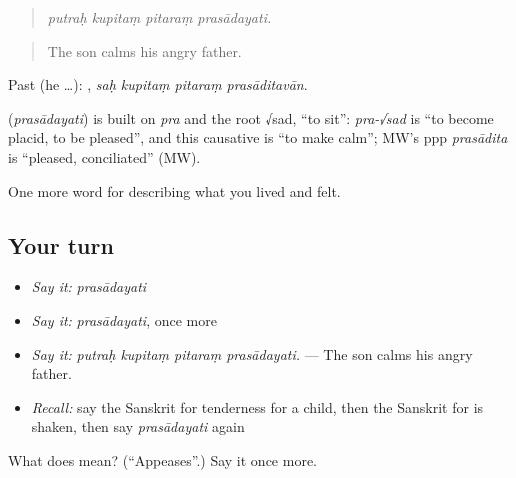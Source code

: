\begin{quote}
   
\end{quote}

\begin{quote}
\emph{putraḥ kupitaṃ pitaraṃ prasādayati.}
\end{quote}

\begin{quote}
The son calms his angry father.
\end{quote}

Past (he …):    , \emph{saḥ kupitaṃ pitaraṃ prasāditavān}.

\begin{cousinweb}
\textbf{} (\emph{prasādayati}) is built on \emph{pra} and the root √sad, \textquotedblleft{}to sit\textquotedblright{}: \emph{pra-√sad} is \textquotedblleft{}to become placid, to be pleased\textquotedblright{}, and this causative is \textquotedblleft{}to make calm\textquotedblright{}; MW's ppp \emph{prasādita} is \textquotedblleft{}pleased, conciliated\textquotedblright{} (MW).
\end{cousinweb}

\begin{grammarlens}[title={What you've built}]
One more word for describing what you lived and felt.
\end{grammarlens}

\subsection*{Your turn}
\begin{itemize}
\raggedright
  \item \emph{Say it:} \emph{prasādayati}
  \item \emph{Say it:} \emph{prasādayati}, once more
  \item \emph{Say it:} \emph{putraḥ kupitaṃ pitaraṃ prasādayati.} — The son calms his angry father.
  \item \emph{Recall:} say the Sanskrit for tenderness for a child, then the Sanskrit for is shaken, then say \emph{prasādayati} again
\end{itemize}

\begin{tcolorbox}[breakable,colback=teal!4,colframe=teal!35!black,title={Before you move on}]
What does  mean? (\textquotedblleft{}Appeases\textquotedblright{}.) Say it once more.
\end{tcolorbox}

